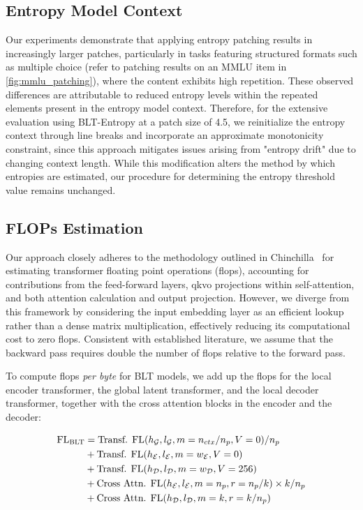 \subsection{Entropy Model Context}
\label{section:entropy-context}
Our experiments demonstrate that applying entropy patching results in increasingly larger patches, particularly in tasks featuring structured formats such as multiple choice (refer to patching results on an MMLU item in \autoref{fig:mmlu_patching}), where the content exhibits high repetition. These observed differences are attributable to reduced entropy levels within the repeated elements present in the entropy model context. Therefore, for the extensive evaluation using {\textsc BLT}-Entropy at a patch size of 4.5, we reinitialize the entropy context through line breaks and incorporate an approximate monotonicity constraint, since this approach mitigates issues arising from "entropy drift" due to changing context length. While this modification alters the method by which entropies are estimated, our procedure for determining the entropy threshold value remains unchanged.

\subsection{FLOPs Estimation} 
\label{section:flops}

Our approach closely adheres to the methodology outlined in Chinchilla~\citep{hoffmann2022training} for estimating transformer floating point operations (flops), accounting for contributions from the feed-forward layers, qkvo projections within self-attention, and both attention calculation and output projection. However, we diverge from this framework by considering the input embedding layer as an efficient lookup rather than a dense matrix multiplication, effectively reducing its computational cost to zero flops. Consistent with established literature, we assume that the backward pass requires double the number of flops relative to the forward pass.

To compute flops \textit{per byte} for {\textsc BLT} models, we add up the flops for the local encoder transformer, the global latent transformer, and the local decoder transformer, together with the cross attention blocks in the encoder and the decoder:

\begin{align}
    \text{FL}_{\text{{\textsc BLT}}} &= \text{Transf. FL}(h_{\mathcal{G}}, l_{\mathcal{G}}, m=n_{ctx}/n_p, V=0) / n_p\\
   &+ \text{Transf. FL}(h_{\mathcal{E}}, l_{\mathcal{E}}, m=w_{\mathcal{E}}, V=0) \\
   &+ \text{Transf. FL}(h_{\mathcal{D}}, l_{\mathcal{D}}, m=w_{\mathcal{D}}, V=256) \\ 
    &+ \text{Cross Attn. FL}(h_{\mathcal{E}}, l_{\mathcal{E}}, m=n_p, r=n_p/k) \times k/n_p \\ 
   &+ \text{Cross Attn. FL}(h_{\mathcal{D}}, l_{\mathcal{D}}, m=k, r=k/n_p) 
\end{align}

